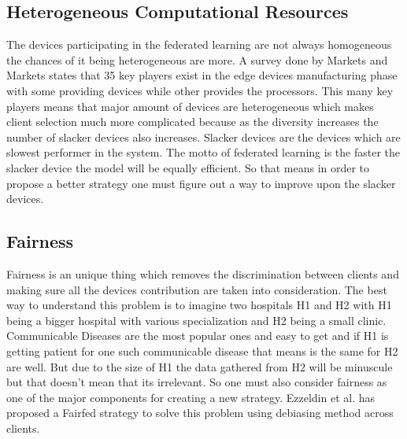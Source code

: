 \documentclass[conference]{IEEEtran}
\begin{document}
\subsection{Heterogeneous Computational Resources}
The devices participating in the federated learning are not always homogeneous the chances of it being heterogeneous are more. A survey done by Markets and Markets \cite{market} states that 35 key players exist in the edge devices manufacturing phase with some providing devices while other provides the processors. This many key players means that major amount of devices are heterogeneous which makes client selection much more complicated because as the diversity increases the number of slacker devices also increases. Slacker devices are the devices which are slowest performer in the system. The motto of federated learning is the faster the slacker device the model will be equally efficient. So that means in order to propose a better strategy one must figure out a way to improve upon the slacker devices. 

\subsection{Fairness}
Fairness is an unique thing which removes the discrimination between clients and making sure all the devices contribution are taken into consideration. The best way to understand this problem is to imagine two hospitals H1 and H2 with H1 being a bigger hospital with various specialization and H2 being a small clinic. Communicable Diseases are the most popular ones and easy to get and if H1 is getting patient for one such communicable disease that means is the same for H2 are well. But due to the size of H1 the data gathered from H2 will be minuscule but that doesn't mean that its irrelevant. So one must also consider fairness as one of the major components for creating a new strategy. Ezzeldin et al. \cite{ezzeldin2023fairfed} has proposed a Fairfed strategy to solve this problem using debiasing method across clients.
 
\end{document}
